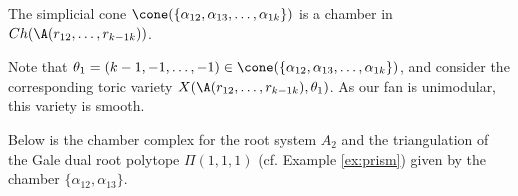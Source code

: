 \begin{lemma}[{\cite[Lemma 4.12]{HW}}]\label{cham_1}
The simplicial cone $\cone(\{\alpha_{12},\alpha_{13}, \ldots ,\alpha_{1k}\})$ is a 
chamber in $Ch(\A(r_{12}, \ldots ,r_{k-1 k}))$.
\end{lemma}

Note that $\theta_1 = (k-1,-1, \ldots ,-1)\in 
\cone(\{\alpha_{12},\alpha_{13}, \ldots ,\alpha_{1k}\})$,  and consider the 
corresponding toric variety
$X(\A(r_{12}, \ldots ,r_{k-1 k}), \theta_1)$. As our fan is unimodular, this variety is smooth.

\begin{exam}
Below is the chamber complex for the root system $A_2$ and the triangulation of 
the Gale dual root polytope $\Pi(1,1,1)$ (cf.  Example \ref{ex:prism}) given by 
the chamber $\{\alpha_{12}, \alpha_{13}\}$.
\end{exam}

